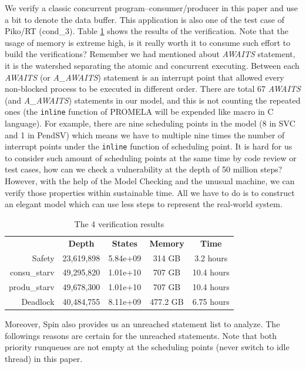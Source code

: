 We verify a classic concurrent program--consumer/producer in this paper and use a bit to denote the data buffer. This application is also one of the test case of Piko/RT (cond\_3). Table \ref{tab:verification} shows the results of the verification. Note that the usage of memory is extreme high, is it really worth it to consume such effort to build the verifications? Remember we had mentioned about \textit{AWAITS} statement, it is the watershed separating the atomic and concurrent executing. Between each \textit{AWAITS} (or \textit{A\_AWAITS}) statement is an interrupt point that allowed every non-blocked process to be executed in different order. There are total 67 \textit{AWAITS} (and \textit{A\_AWAITS}) statements in our model, and this is not counting the repeated ones (the \texttt{inline} function of PROMELA will be expended like macro in C language). For example, there are nine scheduling points in the model (8 in SVC and 1 in PendSV) which means we have to multiple nine times the number of interrupt points under the \texttt{inline} function of scheduling point. It is hard for us to consider such amount of scheduling points at the same time by code review or test cases, how can we check a vulnerability at the depth of 50 million steps? However, with the help of the Model Checking and the unusual machine, we can verify those properties within sustainable time. All we have to do is to construct an elegant model which can use less steps to represent the real-world system.

\begin{table}
\caption{The 4 verification results}
\label{tab:verification}
\begin{tabular}{rcccc}
\toprule
 & \textbf{Depth} & \textbf{States} & \textbf{Memory} & \textbf{Time} \\
 \cmidrule{2-5}
Safety & 23,619,898 & 5.84e+09 & 314 GB & 3.2 hours \\
 \cmidrule{2-5}
consu\_starv & 49,295,820 & 1.01e+10 & 707 GB & 10.4 hours \\
 \cmidrule{2-5}
produ\_starv & 49,678,300 & 1.01e+10 & 707 GB & 10.4 hours \\
 \cmidrule{2-5}
Deadlock & 40,484,755 & 8.11e+09 & 477.2 GB & 6.75 hours \\
\bottomrule
\end{tabular}
\end{table}


Moreover, Spin also provides us an unreached statement list to analyze. The followings reasons are certain for the unreached statements. Note that both priority runqueues are not empty at the scheduling points (never switch to idle thread) in this paper.

